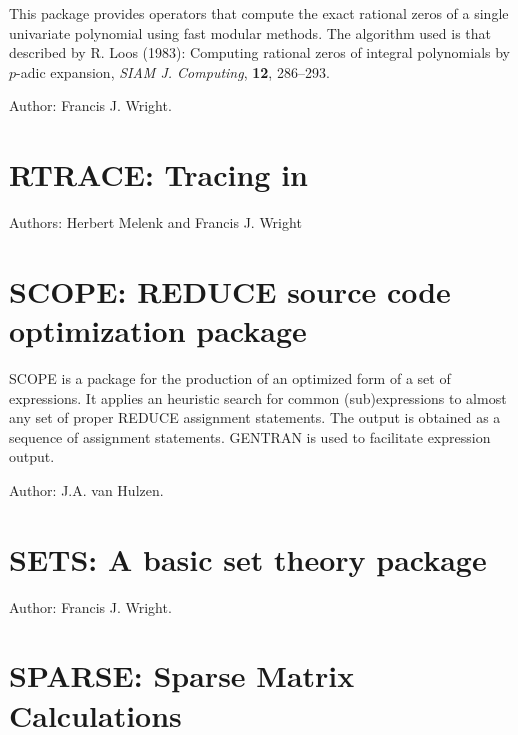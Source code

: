 
This package provides operators that compute the exact rational zeros
of a single univariate polynomial using fast modular methods.  The
algorithm used is that described by R. Loos (1983): Computing rational
zeros of integral polynomials by $p$-adic expansion, \textit{SIAM J.
Computing}, \textbf{12}, 286--293.

Author: Francis J. Wright.



\newpage

\section{RTRACE: Tracing in \REDUCE}

Authors: Herbert Melenk and Francis J. Wright



\newpage

\section{SCOPE: REDUCE source code optimization package} 
\label{SCOPE}

SCOPE is a package for the production of an optimized form of a set of
expressions.  It applies an heuristic search for common (sub)expressions
to almost any set of proper REDUCE assignment statements.  The
output is obtained as a sequence of assignment statements.  GENTRAN is
used to facilitate expression output.

Author:  J.A. van Hulzen.

\newpage

\section{SETS: A basic set theory package} 


Author: Francis J. Wright.



\newpage

\section{SPARSE: Sparse Matrix Calculations}

